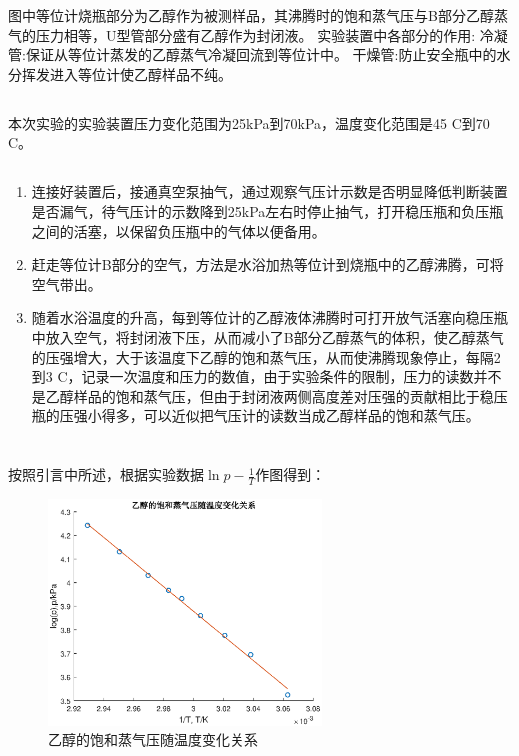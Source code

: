 \documentclass[10.5pt]{ctexart}
\begin{document}
图中等位计烧瓶部分为乙醇作为被测样品，其沸腾时的饱和蒸气压与B部分乙醇蒸气的压力相等，U型管部分盛有乙醇作为封闭液。
实验装置中各部分的作用:\newline
冷凝管:保证从等位计蒸发的乙醇蒸气冷凝回流到等位计中。\newline
干燥管:防止安全瓶中的水分挥发进入等位计使乙醇样品不纯。
\subsection{\textbf{}}
本次实验的实验装置压力变化范围为25kPa到70kPa，温度变化范围是45 \degree C到70 \degree C。
\subsection{\textbf{}}
\begin{enumerate}
\item 连接好装置后，接通真空泵抽气，通过观察气压计示数是否明显降低判断装置是否漏气，待气压计的示数降到25kPa左右时停止抽气，打开稳压瓶和负压瓶之间的活塞，以保留负压瓶中的气体以便备用。
\item 赶走等位计B部分的空气，方法是水浴加热等位计到烧瓶中的乙醇沸腾，可将空气带出。
\item 随着水浴温度的升高，每到等位计的乙醇液体沸腾时可打开放气活塞向稳压瓶中放入空气，将封闭液下压，从而减小了B部分乙醇蒸气的体积，使乙醇蒸气的压强增大，大于该温度下乙醇的饱和蒸气压，从而使沸腾现象停止，每隔2到3 \degree C，记录一次温度和压力的数值，由于实验条件的限制，压力的读数并不是乙醇样品的饱和蒸气压，但由于封闭液两侧高度差对压强的贡献相比于稳压瓶的压强小得多，可以近似把气压计的读数当成乙醇样品的饱和蒸气压。
\end{enumerate}
\section{\textbf{}}
\subsection{\textbf{}}
按照引言中所述，根据实验数据$\ln p-\frac{1}{T}$作图得到：
\begin{figure}[!ht]
  \centering
  \caption{乙醇的饱和蒸气压随温度变化关系}
  \includegraphics[height=6cm]{figure2.eps}
\end{figure}
\end{document}
